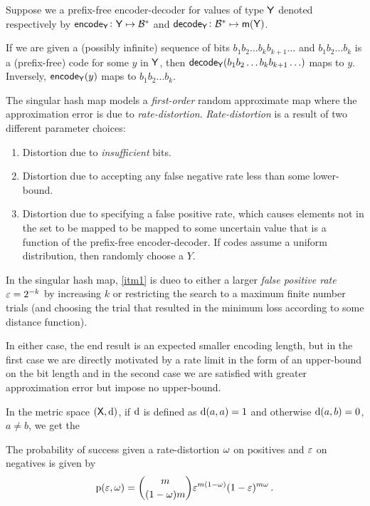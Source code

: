 \documentclass[11pt,final,hidelinks]{article}
\providecommand{\Encode}{\mathsf{encode}}
\providecommand{\Decode}{\mathsf{decode}}
\begin{document}
Suppose we a prefix-free encoder-decoder for values of type $\Set{Y}$ denoted respectively by $\Encode_{\Set{Y}} \colon \Set{Y} \mapsto \BitSet^*$ and $\Decode_{\Set{Y}} \colon \BitSet^* \mapsto \Maybe{\Set{Y}}$.

If we are given a (possibly infinite) sequence of bits $b_1 b_2 \ldots b_k b_{k+1} \ldots$ and $b_1 b_2 \ldots b_k$ is a (prefix-free) code for some $y$ in $\Set{Y}$, then $\Decode_{\Set{Y}}(b_1 b_2 \ldots b_k b_{k+1} \ldots)$ maps to $y$.
Inversely, $\Encode_{\Set{Y}}(y)$ maps to $b_1 b_2 \ldots b_k$.

The singular hash map models a \emph{first-order} random approximate map where the approximation error is due to \emph{rate-distortion}.
\emph{Rate-distortion} is a result of two different parameter choices:
\begin{enumerate}
	\item\label{itm1} Distortion due to \emph{insufficient} bits.
	\item\label{itm1_dup1} Distortion due to accepting any false negative rate less than some lower-bound.
	\item Distortion due to specifying a false positive rate, which causes elements not in the set to be mapped to be mapped to some uncertain value that is a function of the prefix-free encoder-decoder. If codes assume a uniform distribution, then randomly choose a $Y$.
\end{enumerate}

In the singular hash map, \cref{itm1} is dueo to either a larger \emph{false positive rate} $\varepsilon = 2^{-k}$ by increasing $k$ or restricting the search to a maximum finite number trials (and choosing the trial that resulted in the minimum loss according to some distance function).

In either case, the end result is an expected smaller encoding length, but in the first case we are directly motivated by a rate limit in the form of an upper-bound on the bit length and in the second case we are satisfied with greater approximation error but impose no upper-bound.

In the metric space $(\Set{X}, \Fun{d})$, if $\Fun{d}$ is defined as $\Fun{d}(a,a) = 1$ and otherwise $\Fun{d}(a,b) = 0$, $a \neq b$, we get the 

The probability of success given a rate-distortion $\omega$ on positives and $\varepsilon$ on negatives is given by
\begin{equation}
	\Fun{p}(\fprate,\fnrate) = \binom{m}{(1-\fnrate)m} \fprate^{m(1-\fnrate)} (1-\fprate)^{m \fnrate}\,.
\end{equation}
\end{document}
